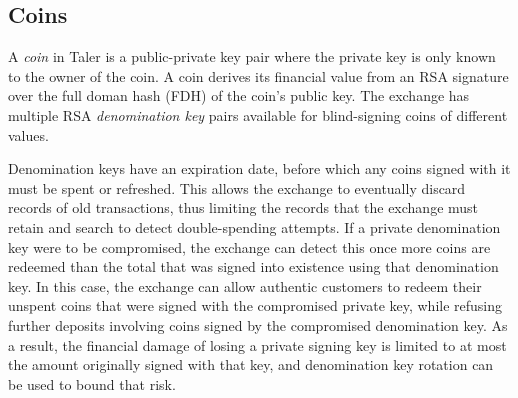 \documentclass{llncs}
\begin{document}



\subsection{Coins}

A \emph{coin} in Taler is a public-private key pair where the private
key is only known to the owner of the coin.  A coin derives its
financial value from an RSA signature over the full doman hash (FDH)
of the coin's public key. The exchange has multiple RSA
{\em denomination key} pairs available for blind-signing coins of
different values.

Denomination keys have an expiration date, before which any coins
signed with it must be spent or refreshed.  This allows the exchange
to eventually discard records of old transactions, thus limiting the
records that the exchange must retain and search to detect
double-spending attempts.  If a private denomination key were to be
compromised, the exchange can detect this once more coins are redeemed
than the total that was signed into existence using that denomination
key.  In this case, the exchange can allow authentic customers to
redeem their unspent coins that were signed with the compromised
private key, while refusing further deposits involving coins signed by
the compromised denomination key.  As a result, the financial damage
of losing a private signing key is limited to at most the amount
originally signed with that key, and denomination key rotation can be
used to bound that risk.
\end{document}
